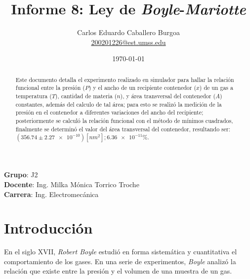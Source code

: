 \documentclass[letter,11pt]{article}
\title{Informe 8: Ley de \emph{Boyle}-\emph{Mariotte}}
\author{Carlos Eduardo Caballero Burgoa \\
    \small{\href{mailto:200201226@est.umss.edu}{200201226@est.umss.edu}}
}
\date{\today}
\begin{document}
\maketitle
\begin{center}
    \textbf{Grupo}: J2\\
    \textbf{Docente}: Ing. Milka Mónica Torrico Troche\\
    \textbf{Carrera}: Ing. Electromecánica
\end{center}

\begin{abstract}
Este documento detalla el experimento realizado en simulador para hallar la
relación funcional entre la presión ($P$) y el ancho de un recipiente
contenedor ($x$) de un gas a temperatura ($T$), cantidad de materia ($n$), y
área transversal del contenedor ($A$) constantes, además del calculo de tal
área; para esto se realizó la medición de la presión en el contenedor a
diferentes variaciones del ancho del recipiente; posteriormente se calculó la
relación funcional con el método de mínimos cuadrados, finalmente se determinó
el valor del área transversal del contenedor, resultando ser:
$(356.74 \pm \num{2.27e-10}) [nm^2]; \num{6.36e-11}\%$.
\end{abstract}

\section{Introducción}

En el siglo XVII, \emph{Robert Boyle} estudió en forma sistemática y
cuantitativa el comportamiento de los gases. En una serie de experimentos,
\emph{Boyle} analizó la relación que existe entre la presión y el volumen de una
muestra de un gas. 
\end{document}

